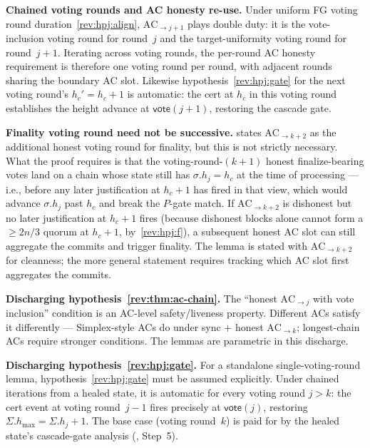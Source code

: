 \ifx\litemode\undefined\documentclass{article}\fi
\newcommand{\hmax}{\ensuremath{h_{\max}}\xspace}
\newcommand{\vote}{\ensuremath{\mathsf{vote}}}
\renewcommand{\paragraph}[1]{\vspace{7pt}\noindent\textbf{#1}}
\theoremstyle{plain}
\theoremstyle{definition}
\theoremstyle{remark}
\begin{document}
\paragraph{Chained voting rounds and AC honesty re-use.}
Under uniform FG voting round duration~\ref{rev:hpj:align}, $\mathrm{AC}_{\to j+1}$ plays double duty: it is the vote-inclusion voting round for round~$j$ and the target-uniformity voting round for round~$j+1$. Iterating across voting rounds, the per-round AC honesty requirement is therefore one voting round per round, with adjacent rounds sharing the boundary AC slot. Likewise hypothesis~\ref{rev:hpj:gate} for the next voting round's $h_c' = h_c + 1$ is automatic: the cert at $h_c$ in this voting round establishes the height advance at $\vote(j+1)$, restoring the cascade gate.

\paragraph{Finality voting round need not be successive.}
 states $\mathrm{AC}_{\to k+2}$ as the additional honest voting round for finality, but this is not strictly necessary. What the proof requires is that the voting-round-$(k+1)$ honest finalize-bearing votes land on a chain whose state still has $\sigma.h_j = h_c$ at the time of processing --- i.e., before any later justification at $h_c + 1$ has fired in that view, which would advance $\sigma.h_j$ past $h_c$ and break the $P$-gate match. If $\mathrm{AC}_{\to k+2}$ is dishonest but no later justification at $h_c + 1$ fires (because dishonest blocks alone cannot form a $\geq 2n/3$ quorum at $h_c + 1$, by~\ref{rev:hpj:f}), a subsequent honest AC slot can still aggregate the commits and trigger finality. The lemma is stated with $\mathrm{AC}_{\to k+2}$ for cleanness; the more general statement requires tracking which AC slot first aggregates the commits.

\paragraph{Discharging hypothesis~\ref{rev:thm:ac-chain}.}
The ``honest $\mathrm{AC}_{\to j}$ with vote inclusion'' condition is an AC-level safety/liveness property. Different ACs satisfy it differently --- Simplex-style ACs do under sync $+$ honest $\mathrm{AC}_{\to k}$; longest-chain ACs require stronger conditions. The lemmas are parametric in this discharge.

\paragraph{Discharging hypothesis~\ref{rev:hpj:gate}.}
For a standalone single-voting-round lemma, hypothesis~\ref{rev:hpj:gate} must be assumed explicitly. Under chained iterations from a healed state, it is automatic for every voting round $j > k$: the cert event at voting round~$j-1$ fires precisely at $\vote(j)$, restoring $\Sigma.\hmax = \Sigma.h_j + 1$. The base case (voting round~$k$) is paid for by the healed state's cascade-gate analysis (, Step~5).
\end{document}
